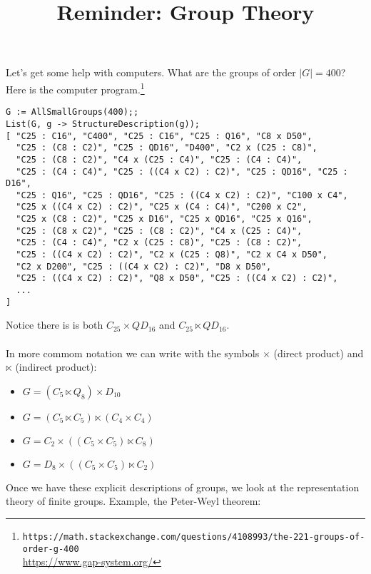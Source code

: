 \documentclass[12pt]{article}
\title{Reminder: Group Theory}
\date{}
\begin{document}
\sffamily

\maketitle

{\fontsize{16pt}{16pt}\selectfont 

\noindent Let's get some help with computers.  What are the groups of order $|G| = 400$?  Here is the computer program.\footnote{\texttt{https://math.stackexchange.com/questions/4108993/the-221-groups-of-order-g-400} \\
\url{https://www.gap-system.org/}}

\begin{verbatim}
G := AllSmallGroups(400);;
List(G, g -> StructureDescription(g));
[ "C25 : C16", "C400", "C25 : C16", "C25 : Q16", "C8 x D50",
  "C25 : (C8 : C2)", "C25 : QD16", "D400", "C2 x (C25 : C8)",
  "C25 : (C8 : C2)", "C4 x (C25 : C4)", "C25 : (C4 : C4)",
  "C25 : (C4 : C4)", "C25 : ((C4 x C2) : C2)", "C25 : QD16", "C25 : D16",
  "C25 : Q16", "C25 : QD16", "C25 : ((C4 x C2) : C2)", "C100 x C4",
  "C25 x ((C4 x C2) : C2)", "C25 x (C4 : C4)", "C200 x C2",
  "C25 x (C8 : C2)", "C25 x D16", "C25 x QD16", "C25 x Q16",
  "C25 : (C8 x C2)", "C25 : (C8 : C2)", "C4 x (C25 : C4)",
  "C25 : (C4 : C4)", "C2 x (C25 : C8)", "C25 : (C8 : C2)",
  "C25 : ((C4 x C2) : C2)", "C2 x (C25 : Q8)", "C2 x C4 x D50",
  "C2 x D200", "C25 : ((C4 x C2) : C2)", "D8 x D50",
  "C25 : ((C4 x C2) : C2)", "Q8 x D50", "C25 : ((C4 x C2) : C2)",
  ...
]
\end{verbatim}
Notice there is is both $C_{25} \times QD_{16}$ and $C_{25}\ltimes QD_{16}$. \\ \\
In more commom notation we can write with the symbols $\times$ (direct product) and $\ltimes$ (indirect product):
\begin{itemize}
\item $G = (C_5 \ltimes Q_8 ) \times D_{10}$
\item $G = (C_5 \ltimes C_5) \ltimes (C_4 \times C_4) $
\item $G = C_2 \times ((C_5 \times C_5) \ltimes C_8)$
\item $G = D_8 \times ((C_5 \times C_5) \ltimes C_2)$
\end{itemize}
Once we have these explicit descriptions of groups, we  look at the representation theory of finite groups.  Example, the Peter-Weyl theorem:
$$  $$

\newpage

}
\end{document}
